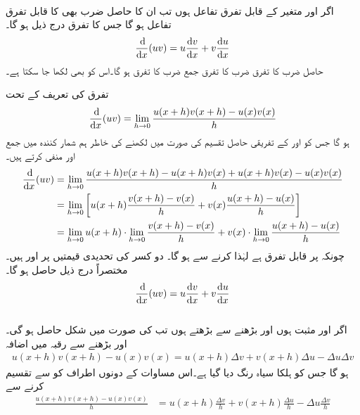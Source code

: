 \\
اگر  اور  متغیر  کے قابل تفرق تفاعل ہوں تب ان کا حاصل ضرب  بھی  کا قابل تفرق تفاعل ہو گا جس کا تفرق درج ذیل ہو گا۔
\begin{align*}
\frac{\dif}{\dif x}(uv)=u\frac{\dif v}{\dif x}+v\frac{\dif u}{\dif x}
\end{align*}
حاصل ضرب  کا تفرق  ضرب  کا تفرق جمع  ضرب  کا تفرق ہو گا۔اس کو  بھی لکھا جا سکتا ہے۔

تفرق کی تعریف کے تحت
\begin{align*}
\frac{\dif}{\dif x}(uv)=\lim_{h\to 0}\frac{u(x+h)v(x+h)-u(x)v(x)}{h}
\end{align*}
ہو گا جس کو  اور  کے تفریقی حاصل تقسیم کی صورت میں لکھنے کی خاطر ہم شمار کنندہ میں  جمع اور منفی کرتے ہیں۔
\begin{align*}
\frac{\dif}{\dif x}(uv)&=\lim_{h\to 0}\frac{u(x+h)v(x+h)-u(x+h)v(x)+u(x+h)v(x)-u(x)v(x)}{h}\\
&=\lim_{h\to 0}\left[u(x+h)\frac{v(x+h)-v(x)}{h}+v(x)\frac{u(x+h)-u(x)}{h} \right]\\
&=\lim_{h\to 0} u(x+h)\cdot \lim_{h\to 0}\frac{v(x+h)-v(x)}{h}+v(x)\cdot\lim_{h\to 0}\frac{u(x+h)-u(x)}{h}
\end{align*}
چونکہ  پر  قابل تفرق ہے لہٰذا  کرنے سے  ہو گا۔ دو کسر کی تحدیدی قیمتیں  پر   اور  ہیں۔مختصراً درج ذیل  حاصل ہو گا۔
\begin{align*}
\frac{\dif}{\dif x}(uv)=u\frac{\dif v}{\dif x}+v\frac{\dif u}{\dif x}
\end{align*}
\\
اگر  اور  مثبت ہوں اور  بڑھنے سے بڑھتے ہوں تب   کی صورت میں شکل  حاصل ہو گی۔ اور  بڑھنے سے رقبہ میں اضافہ
\begin{align*}
u(x+h)v(x+h)-u(x)v(x)=u(x+h)\Delta v+v(x+h)\Delta u-\Delta u\Delta v
\end{align*}
ہو گا جس کو ہلکا سیاہ رنگ دیا گیا ہے۔اس مساوات کے دونوں اطراف کو  سے تقسیم  کرنے سے
\begin{align*}
\frac{u(x+h)v(x+h)-u(x)v(x)}{h}&=u(x+h)\frac{\Delta v}{h}+v(x+h)\frac{\Delta u}{h}-\Delta u\frac{\Delta v}{h}
\end{align*}

